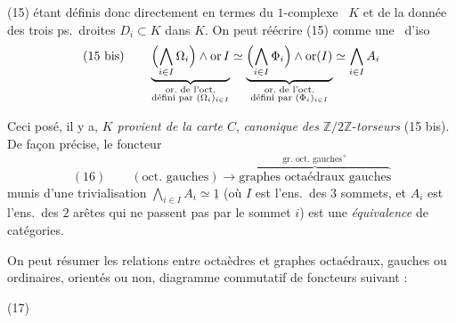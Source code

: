 \documentclass[11pt,a4paper]{article}
\begin{document}
(15) étant définis donc directement en termes du $1$-complexe \ $K$ et de la donnée des trois ps.\ droites $D_i \subset K$ dans $K$. On peut réécrire (15) comme une \ d'iso
\[
(15\ \text{bis}) \qquad
\underbrace{\Bigl(\bigwedge_{i \in I} \Omega_i\Bigr) \wedge \operatorname{or} I}_{\substack{\text{or.\ de l'oct.} \\ \text{défini par } (\Omega_i)_{i \in I}}}
\simeq
\underbrace{\Bigl(\bigwedge_{i \in I} \Phi_i\Bigr) \wedge \operatorname{or}(I)}_{\substack{\text{or.\ de l'oct.} \\ \text{défini par } (\Phi_i)_{i \in I}}}
\simeq \bigwedge_{i \in I} A_i
\]

Ceci posé, il y a,   \emph{$K$ provient de la carte $C$},   \emph{canonique} \emph{des} $\mathbb{Z}/2\mathbb{Z}$-\emph{torseurs} (15 bis). De façon précise, le foncteur
\[
(16) \qquad (\text{oct.\ gauches}) \longrightarrow \overbrace{\text{graphes octaédraux gauches}}^{\text{gr.\ oct.\ gauches}^{+}}
\]
munis d'une trivialisation $\bigwedge_{i \in I} A_i \simeq \underline{1}$ (où $I$ est l'ens.\ des $3$ sommets, et $A_i$ est l'ens.\ des $2$ arêtes qui ne passent pas par le sommet $i$)  est une \emph{équivalence} de catégories.

On peut résumer les relations entre octaèdres et graphes octaédraux, gauches ou ordinaires, orientés ou non, \ill{}  diagramme commutatif de foncteurs suivant  :

(17)

\end{document}
